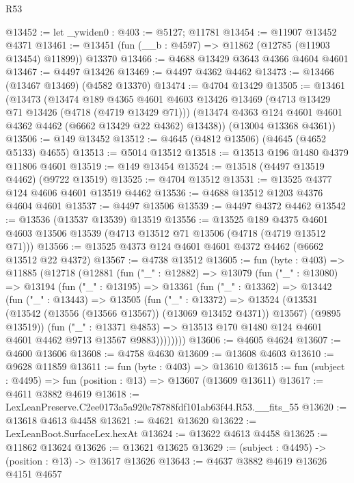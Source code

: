 \begin{lexlean}{R53}
\begin{coremodule}
@13452 := let _ywiden0 : @403 := @5127; @11781
@13454 := @11907 @13452 @4371
@13461 := @13451 (fun (__b : @4597) => @11862 (@12785 (@11903 @13454) @11899)) @13370
@13466 := @4688 @13429 @3643 @4366 @4604 @4601
@13467 := @4497 @13426
@13469 := @4497 @4362 @4462
@13473 := @13466 (@13467 @13469) (@4582 @13370)
@13474 := @4704 @13429
@13505 := @13461
    (@13473
      (@13474
        @189
        @4365
        @4601
        @4603
        @13426
        @13469
        (@4713 @13429 @71 @13426 (@4718 (@4719 @13429 @71)))
        (@13474 @4363 @124 @4601 @4601 @4362 @4462 (@6662 @13429 @22 @4362) @13438))
      (@13004 @13368 @4361))
@13506 := @149 @13452
@13512 := @4645 (@4812 @13506) (@4645 (@4652 @5133) @4655)
@13513 := @5014 @13512
@13518 := @13513 @196 @1480 @4379 @11806 @4601
@13519 := @149 @13454
@13524 := @13518 (@4497 @13519 @4462) (@9722 @13519)
@13525 := @4704 @13512
@13531 := @13525 @4377 @124 @4606 @4601 @13519 @4462
@13536 := @4688 @13512 @1203 @4376 @4604 @4601
@13537 := @4497 @13506
@13539 := @4497 @4372 @4462
@13542 := @13536 (@13537 @13539) @13519
@13556 := @13525
    @189
    @4375
    @4601
    @4603
    @13506
    @13539
    (@4713 @13512 @71 @13506 (@4718 (@4719 @13512 @71)))
@13566 := @13525 @4373 @124 @4601 @4601 @4372 @4462 (@6662 @13512 @22 @4372)
@13567 := @4738 @13512
@13605 := fun (byte : @403) =>
  @11885
    (@12718
      (@12881
        (fun ("_" : @12882) =>
        @13079
          (fun ("_" : @13080) =>
          @13194
            (fun ("_" : @13195) =>
            @13361
              (fun ("_" : @13362) =>
              @13442
                (fun ("_" : @13443) =>
                @13505
                  (fun ("_" : @13372) =>
                  @13524
                    (@13531 (@13542 (@13556 (@13566 @13567)) (@13069 @13452 @4371)) @13567)
                    (@9895 @13519))
                  (fun ("_" : @13371 @4853) =>
                  @13513 @170 @1480 @124 @4601 @4601 @4462 @9713 @13567 @9883))))))))
@13606 := @4605 @4624
@13607 := @4600 @13606
@13608 := @4758 @4630
@13609 := @13608 @4603
@13610 := @9628 @11859
@13611 := fun (byte : @403) => @13610
@13615 := fun (subject : @4495) => fun (position : @13) => @13607 (@13609 @13611)
@13617 := @4611 @3882 @4619
@13618 := LexLeanPreserve.C2ee0173a5a920c78788fdf101ab63f44.R53.__fits_55
@13620 := @13618 @4613 @4458
@13621 := @4621 @13620
@13622 := LexLeanBoot.SurfaceLex.hexAt
@13624 := @13622 @4613 @4458
@13625 := @11862 @13624
@13626 := @13621 @13625
@13629 := (subject : @4495) -> (position : @13) -> @13617 @13626
@13643 := @4637
    @3882
    @4619
    @13626
    @4151
    @4657

\end{coremodule}
\end{lexlean}
